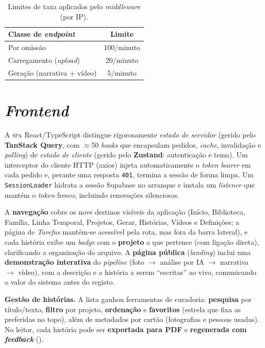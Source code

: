 \begin{table}[H]
\centering
\caption{Limites de taxa aplicados pelo \emph{middleware} (por IP).}
\label{tab:rate}
\small
\begin{tabular}{@{}lc@{}}
\toprule
\textbf{Classe de \emph{endpoint}} & \textbf{Limite} \\
\midrule
Por omissão & 100/minuto \\
Carregamento (\emph{upload}) & 20/minuto \\
Geração (narrativa + vídeo) & 5/minuto \\
\bottomrule
\end{tabular}
\end{table}

\section{\emph{Frontend}}
\label{sec:impl_frontend}

A \textsc{spa} React/TypeScript distingue rigorosamente \emph{estado de
servidor} (gerido pelo \textbf{TanStack Query}, com $\approx$50 \emph{hooks}
que encapsulam pedidos, \emph{cache}, invalidação e \emph{polling}) de
\emph{estado de cliente} (gerido pelo \textbf{Zustand}: autenticação e
tema). Um interceptor do cliente HTTP (axios) injeta automaticamente o
\emph{token} \emph{bearer} em cada pedido e, perante uma resposta
\texttt{401}, termina a sessão de forma limpa. Um \texttt{SessionLoader}
hidrata a sessão Supabase no arranque e instala um \emph{listener} que
mantém o \emph{token} fresco, incluindo renovações silenciosas.

A \textbf{navegação} cobre os nove destinos visíveis da aplicação (Início,
Biblioteca, Família, Linha Temporal, Projetos, Gerar, Histórias, Vídeos e
Definições; a página de \emph{Tarefas} mantém-se acessível pela rota, mas
fora da barra lateral), e cada história exibe um \emph{badge} com o
\textbf{projeto} a que pertence (com ligação direta), clarificando a
organização do arquivo. A
\textbf{página pública} (\emph{landing}) inclui uma \textbf{demonstração
interativa} do \emph{pipeline} (foto $\rightarrow$ análise por IA $\rightarrow$
narrativa $\rightarrow$ vídeo), com a descrição e a história a serem
``escritas'' ao vivo, comunicando o valor do sistema antes do registo.

\textbf{Gestão de histórias.} A lista ganhou ferramentas de curadoria:
\textbf{pesquisa} por título/texto, \textbf{filtro} por projeto,
\textbf{ordenação} e \textbf{favoritos} (estrela que fixa as preferidas no
topo), além de metadados por cartão (fotografias e pessoas usadas). No
leitor, cada história pode ser \textbf{exportada para PDF} e
\textbf{regenerada com \emph{feedback}} ().

